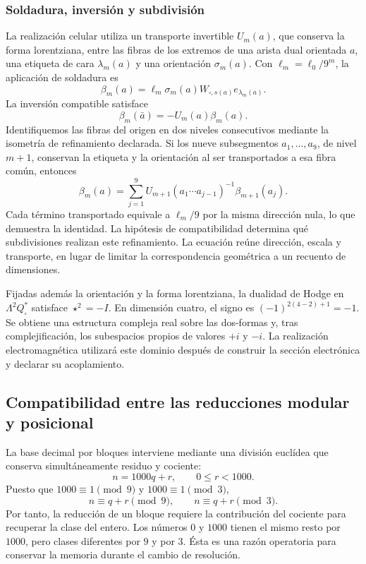 \subsubsection{Soldadura, inversión y subdivisión}

La realización celular utiliza un transporte invertible \(U_m(a)\),
que conserva la forma lorentziana, entre las fibras de los extremos de
una arista dual orientada \(a\), una etiqueta
de cara \(\lambda_m(a)\) y una orientación \(\sigma_m(a)\).
Con \(\ell_m=\ell_0/9^m\), la aplicación de soldadura es
\[
 \beta_m(a)=\ell_m\sigma_m(a)
 W_{\square,s(a)}e_{\lambda_m(a)}.
\]
La inversión compatible satisface
\[
 \beta_m(\bar a)=-U_m(a)\beta_m(a).
\]
Identifiquemos las fibras del origen en dos niveles consecutivos mediante
la isometría de refinamiento declarada. Si los nueve subsegmentos
\(a_1,\ldots,a_9\), de nivel \(m+1\), conservan la etiqueta
y la orientación al ser transportados a esa fibra común, entonces
\begin{equation}
 \beta_m(a)=\sum_{j=1}^9
 U_{m+1}(a_1\cdots a_{j-1})^{-1}\beta_{m+1}(a_j).
 \label{eq:soldadura-refinamiento}
\end{equation}
Cada término transportado equivale a \(\ell_m/9\) por la misma
dirección nula, lo que demuestra la identidad. La hipótesis de
compatibilidad determina qué subdivisiones realizan este refinamiento.
La ecuación reúne dirección, escala y transporte, en lugar de limitar
la correspondencia geométrica a un recuento de dimensiones.

Fijadas además la orientación y la forma lorentziana, la dualidad de
Hodge en \(\Lambda^2Q_\square^*\) satisface \(\star^2=-I\).
En dimensión cuatro, el signo es \((-1)^{2(4-2)+1}=-1\).
Se obtiene una estructura compleja real sobre las dos-formas y,
tras complejificación, los subespacios propios de valores \(+i\) y
\(-i\). La realización electromagnética utilizará este dominio
después de construir la sección electrónica y declarar su acoplamiento.

\subsection{Compatibilidad entre las reducciones modular y posicional}

La base decimal por bloques interviene mediante una división euclídea
que conserva simultáneamente residuo y cociente:
\[
 n=1000q+r,\qquad 0\le r<1000.
\]
Puesto que \(1000\equiv1\pmod9\) y \(1000\equiv1\pmod3\),
\[
 n\equiv q+r\pmod9,\qquad n\equiv q+r\pmod3.
\]
Por tanto, la reducción de un bloque requiere la contribución del
cociente para recuperar la clase del entero. Los números \(0\) y
\(1000\) tienen el mismo resto por \(1000\), pero clases diferentes
por \(9\) y por \(3\). Ésta es una razón operatoria para conservar
la memoria durante el cambio de resolución.

